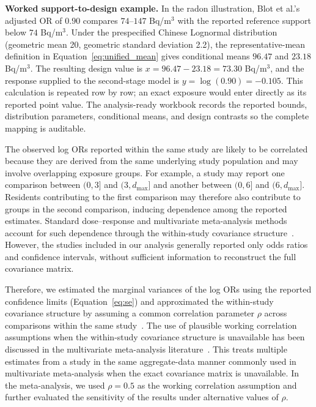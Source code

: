\documentclass[journal=rsm]{CUP-JNL-DTM}%
\theoremstyle{definition}
\numberwithin{equation}{section}
\begin{document}
\noindent\textbf{Worked support-to-design example.}
In the radon illustration, Blot et al.'s adjusted OR of $0.90$ compares
$74$--$147$ Bq/m$^3$ with the reported reference support below $74$ Bq/m$^3$.
Under the prespecified Chinese Lognormal distribution (geometric mean 20,
geometric standard deviation 2.2), the representative-mean definition in
Equation~\ref{eq:unified_mean} gives
conditional means $96.47$ and $23.18$ Bq/m$^3$. The resulting design value is
$x=96.47-23.18=73.30$ Bq/m$^3$, and the response supplied to the second-stage
model is $y=\log(0.90)=-0.105$. This calculation is repeated row by row; an
exact exposure would enter directly as its reported point value. The
analysis-ready workbook records the reported bounds, distribution parameters,
conditional means, and design contrasts so the complete mapping is auditable.

The observed log ORs reported within the same study are likely to be
correlated because they are derived from the same underlying study population
and may involve overlapping exposure groups. For example, a study may report
one comparison between $(0,3]$ and $(3,d_{\max}]$ and another between
$(0,6]$ and $(6,d_{\max}]$. Residents contributing to the first comparison
may therefore also contribute to groups in the second comparison, inducing
dependence among the reported estimates. Standard dose--response and
multivariate meta-analysis methods account for such dependence through the
within-study covariance structure~\cite{Greenland1992, Orsini2012}. However,
the studies included in our analysis generally reported only odds ratios and
confidence intervals, without sufficient information to reconstruct the full
covariance matrix.

Therefore, we estimated the marginal variances of the log ORs using the reported confidence limits (Equation~\ref{eq:se}) and approximated the within-study covariance structure by assuming a common correlation parameter $\rho$ across comparisons within the same study~\cite{Higgins1996}. The use of plausible working correlation assumptions when the within-study covariance structure is unavailable has been discussed in the multivariate meta-analysis literature~\cite{Jackson2011, Wei2012}. This treats multiple estimates from a study in the same aggregate-data manner commonly used in multivariate meta-analysis when the exact covariance matrix is unavailable. In the meta-analysis, we used $\rho = 0.5$ as the working correlation assumption and further evaluated the sensitivity of the results under alternative values of $\rho$.
\end{document}

